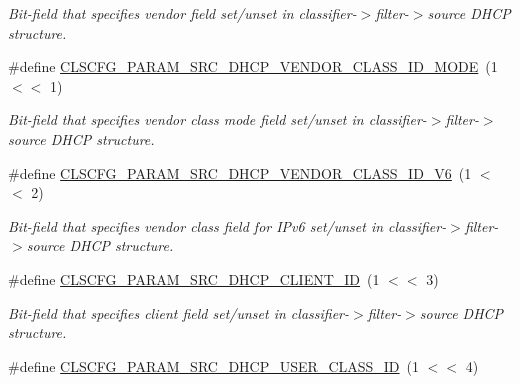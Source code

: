 \begin{DoxyCompactItemize}
\begin{DoxyCompactList}\small\item\em Bit-\/field that specifies vendor field set/unset in classifier-\/$>$filter-\/$>$source D\-H\-C\-P structure. \end{DoxyCompactList}\item 
\hypertarget{group__FAPI__QOS__CLASS_ga3f7f4f7a6ee13310e72b3754d5997c56}{\#define \hyperlink{group__FAPI__QOS__CLASS_ga3f7f4f7a6ee13310e72b3754d5997c56}{C\-L\-S\-C\-F\-G\-\_\-\-P\-A\-R\-A\-M\-\_\-\-S\-R\-C\-\_\-\-D\-H\-C\-P\-\_\-\-V\-E\-N\-D\-O\-R\-\_\-\-C\-L\-A\-S\-S\-\_\-\-I\-D\-\_\-\-M\-O\-D\-E}~(1 $<$$<$ 1)}\label{group__FAPI__QOS__CLASS_ga3f7f4f7a6ee13310e72b3754d5997c56}

\begin{DoxyCompactList}\small\item\em Bit-\/field that specifies vendor class mode field set/unset in classifier-\/$>$filter-\/$>$source D\-H\-C\-P structure. \end{DoxyCompactList}\item 
\hypertarget{group__FAPI__QOS__CLASS_gaa26bc18556806690c47a2bc28d5bac3e}{\#define \hyperlink{group__FAPI__QOS__CLASS_gaa26bc18556806690c47a2bc28d5bac3e}{C\-L\-S\-C\-F\-G\-\_\-\-P\-A\-R\-A\-M\-\_\-\-S\-R\-C\-\_\-\-D\-H\-C\-P\-\_\-\-V\-E\-N\-D\-O\-R\-\_\-\-C\-L\-A\-S\-S\-\_\-\-I\-D\-\_\-\-V6}~(1 $<$$<$ 2)}\label{group__FAPI__QOS__CLASS_gaa26bc18556806690c47a2bc28d5bac3e}

\begin{DoxyCompactList}\small\item\em Bit-\/field that specifies vendor class field for I\-Pv6 set/unset in classifier-\/$>$filter-\/$>$source D\-H\-C\-P structure. \end{DoxyCompactList}\item 
\hypertarget{group__FAPI__QOS__CLASS_ga0aaa52fa7cde16551a30df124ef509ac}{\#define \hyperlink{group__FAPI__QOS__CLASS_ga0aaa52fa7cde16551a30df124ef509ac}{C\-L\-S\-C\-F\-G\-\_\-\-P\-A\-R\-A\-M\-\_\-\-S\-R\-C\-\_\-\-D\-H\-C\-P\-\_\-\-C\-L\-I\-E\-N\-T\-\_\-\-I\-D}~(1 $<$$<$ 3)}\label{group__FAPI__QOS__CLASS_ga0aaa52fa7cde16551a30df124ef509ac}

\begin{DoxyCompactList}\small\item\em Bit-\/field that specifies client field set/unset in classifier-\/$>$filter-\/$>$source D\-H\-C\-P structure. \end{DoxyCompactList}\item 
\hypertarget{group__FAPI__QOS__CLASS_gaf80d9e2de58e9144d4f429d8283f77c7}{\#define \hyperlink{group__FAPI__QOS__CLASS_gaf80d9e2de58e9144d4f429d8283f77c7}{C\-L\-S\-C\-F\-G\-\_\-\-P\-A\-R\-A\-M\-\_\-\-S\-R\-C\-\_\-\-D\-H\-C\-P\-\_\-\-U\-S\-E\-R\-\_\-\-C\-L\-A\-S\-S\-\_\-\-I\-D}~(1 $<$$<$ 4)}\label{group__FAPI__QOS__CLASS_gaf80d9e2de58e9144d4f429d8283f77c7}


\end{DoxyCompactItemize}
